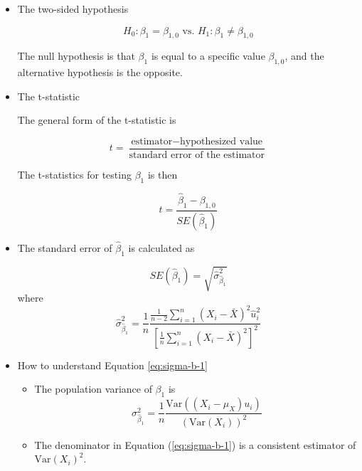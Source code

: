 \documentclass[a4paper,11pt]{article}
\newcommand{\var}{\mathrm{Var}}
\begin{document}
\begin{itemize}
\item The two-sided hypothesis
\label{sec:org3b9ba12}

\[ H_0: \beta_1 = \beta_{1,0} \text{ vs. } H_1: \beta_1 \neq \beta_{1,0} \]

The null hypothesis is that \(\beta_1\) is equal to a specific value
\(\beta_{1,0}\), and the alternative hypothesis is the opposite. 

\item The t-statistic
\label{sec:org38c85a9}

The general form of the t-statistic is

\begin{equation}
\label{eq:general-t}
t = \frac{\text{estimator} - \text{hypothesized value}}{\text{standard error of the estimator}}
\end{equation}

The t-statistics for testing \(\beta_1\) is then

\begin{equation}
\label{eq:t-stat-b1}
t = \frac{\hat{\beta}_1 - \beta_{1,0}}{SE(\hat{\beta}_1)}
\end{equation}

\item The standard error of \(\hat{\beta}_1\) is calculated as
\label{sec:org1e31c37}

\begin{equation}
\label{eq:se-b-1}
SE(\hat{\beta}_1) = \sqrt{\hat{\sigma}^2_{\hat{\beta}_1}}
\end{equation}
where
\begin{equation}
\label{eq:sigma-b-1}
\hat{\sigma}^2_{\hat{\beta}_1} = \frac{1}{n} \frac{\frac{1}{n-2} \sum_{i=1}^n (X_i - \bar{X})^2 \hat{u}^2_i}{\left[ \frac{1}{n} \sum_{i=1}^n (X_i - \bar{X})^2 \right]^2}
\end{equation}

\item How to understand Equation \ref{eq:sigma-b-1}
\label{sec:org9fac894}

\begin{itemize}
\item The population variance of \(\beta_1\) is 
\[ \sigma^2_{\hat{\beta}_1} = \frac{1}{n} \frac{\var\left( (X_i - \mu_X)u_i \right)}{\left( \var(X_i) \right)^2} \]

\item The denominator in Equation (\ref{eq:sigma-b-1}) is a consistent
estimator of \(\var(X_i)^2\).


\end{itemize}
\end{itemize}
\end{document}
